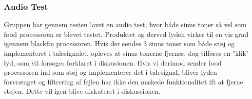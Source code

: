 \subsubsection{Audio Test}
Gruppen har gennem testen lavet en audio test, hvor både sinus toner så vel som food processoren er blevet testet. 
Produktet og derved lyden virker til en vis grad igennem blackfin processoren. Hvis der sendes 3 sinus toner som både støj og implementeret i talesignalet, opleves at sinus tonerne fjernes, dog tilføres en "klik" lyd, som vil forsøges forklaret i diskusionen. Hvis vi derimod sender food processoren ind som støj og implementerer det i talesignal, bliver lyden forvrænget og filtrering af fejlen har ikke den ønskede funktionalitet ift at fjerne støjen. Dette vil igen blive diskuteret i diskussionen. 